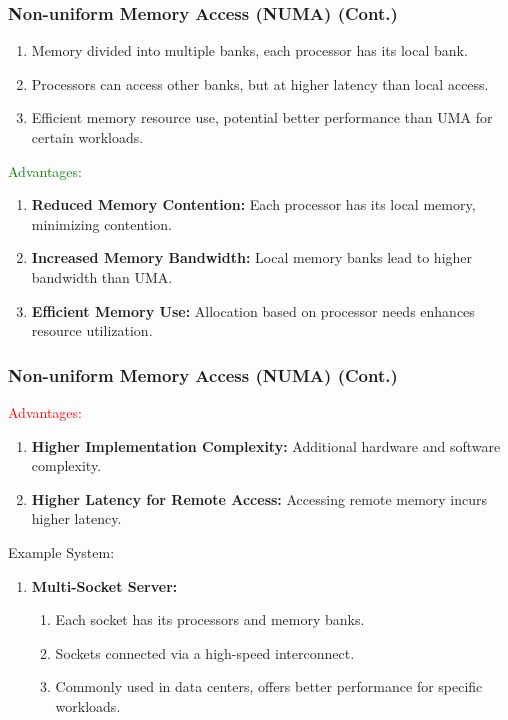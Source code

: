 \documentclass[
	12pt, %
]{beamer}
\begin{document}
\begin{frame}
	\frametitle{Non-uniform Memory Access (NUMA) (Cont.)}
	
	\begin{enumerate}
		\item Memory divided into multiple banks, each processor has its local bank.
		\item Processors can access other banks, but at higher latency than local access.
		\item Efficient memory resource use, potential better performance than UMA for certain workloads.
	\end{enumerate}
	
	\textcolor{green}{Advantages:}
	\begin{enumerate}
		\item \textbf{Reduced Memory Contention:} Each processor has its local memory, minimizing contention.
		\item \textbf{Increased Memory Bandwidth:} Local memory banks lead to higher bandwidth than UMA.
		\item \textbf{Efficient Memory Use:} Allocation based on processor needs enhances resource utilization.
	\end{enumerate}
	
	
\end{frame}



\begin{frame}
	\frametitle{Non-uniform Memory Access (NUMA) (Cont.)}
	
	\textcolor{red}{Advantages:}
	\begin{enumerate}
		\item \textbf{Higher Implementation Complexity:} Additional hardware and software complexity.
		\item \textbf{Higher Latency for Remote Access:} Accessing remote memory incurs higher latency.
	\end{enumerate}
	
	Example System:
	\begin{enumerate}
		\item \textbf{Multi-Socket Server:}
		\begin{enumerate}
			\item Each socket has its processors and memory banks.
			\item Sockets connected via a high-speed interconnect.
			\item Commonly used in data centers, offers better performance for specific workloads.
		\end{enumerate}
	\end{enumerate}
\end{frame}
\end{document}
